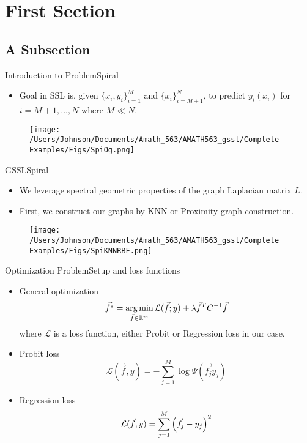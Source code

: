\section{First Section}

\subsection{A Subsection}
	\begin{frame}{Introduction to Problem}{Spiral}
		\begin{itemize}
			\item Goal in SSL is, given $\{x_i,y_i\}_{i=1}^{M}$ and $\{x_i\}_{i=M+1}^{N}$, to predict $y_i(x_i)$ for $i=M+1, \dots , N$ where $M \ll N$.
		\end{itemize}
		\begin{figure}[H]
			\centering
			\hspace*{0cm}\texttt{[image: /Users/Johnson/Documents/Amath\_563/AMATH563\_gssl/Complete Examples/Figs/SpiOg.png]}
		\end{figure}
	\end{frame}

	\begin{frame}{GSSL}{Spiral}
		\begin{itemize}
			\item We leverage spectral geometric properties of the graph Laplacian matrix $L$.
			\item First, we construct our graphs by KNN or Proximity graph construction.
		\end{itemize}
		\begin{figure}[H]
			\centering
			\hspace*{0cm}\texttt{[image: /Users/Johnson/Documents/Amath\_563/AMATH563\_gssl/Complete Examples/Figs/SpiKNNRBF.png]}
		\end{figure}
	\end{frame}

	\begin{frame}{Optimization Problem}{Setup and loss functions}
		\begin{itemize}
			\item General optimization
			\[\vec{f^*} = \operatorname*{arg\,min}_{\vec{f} \in \mathbb{R}^{m}} \mathcal{L}(\vec{f};y) + \lambda \vec{f}^{T}C^{-1}\vec{f}\]
			where $\mathcal{L}$ is a loss function, either Probit or Regression loss in our case.
			\item Probit loss
			\[
				\mathcal{L}(\vec{f},y) = - \sum_{j=1}^{M}\log \Psi (\vec{f_j}y_j)	
			\]
			\item Regression loss
			\[
				\mathcal{L}(\vec{f},y) = \sum_{j=1}^{M}{\left(\vec{f}_{j} - y_{j}\right)}^2
			\]
		\end{itemize}
	\end{frame}

